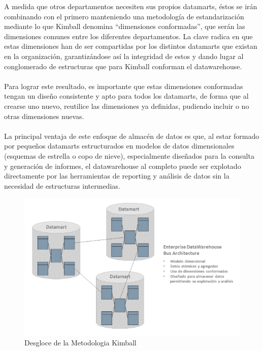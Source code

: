 \documentclass[11pt,a4paper]{article}
\begin{document}
\begin{enumerate}[A.]
			A medida que otros departamentos necesiten sus propios datamarts, éstos se irán combinando con el primero manteniendo una metodología de estandarización mediante lo que Kimball denomina “dimensiones conformadas”, que serán las dimensiones comunes entre los diferentes departamentos. La clave radica en que estas dimensiones han de ser compartidas por los distintos datamarts que existan en la organización, garantizándose así la integridad de estos y dando lugar al conglomerado de estructuras que para Kimball conforman el datawarehouse.\\
			\\
			Para lograr este resultado, es importante que estas dimensiones conformadas tengan un diseño consistente y apto para todos los datamarts, de forma que al crearse uno nuevo, reutilice las dimensiones ya definidas, pudiendo incluir o no otras dimensiones nuevas.\\
			\\
			La principal ventaja de este enfoque de almacén de datos es que, al estar formado por pequeños datamarts estructurados en modelos de datos dimensionales (esquemas de estrella o copo de nieve), especialmente diseñados para la consulta y generación de informes, el datawarehouse al completo puede ser explotado directamente por las herramientas de reporting y análisis de datos sin la necesidad de estructuras intermedias.
			
			\begin{figure}[!ht]
				\begin{center}
					\includegraphics[scale=1.5]{./Imagenes/img07}	
					\caption{Desgloce de la Metodologia Kimball}		
				\end{center}
			\end{figure}
						
		\end{enumerate}
		\newpage
\end{document}
